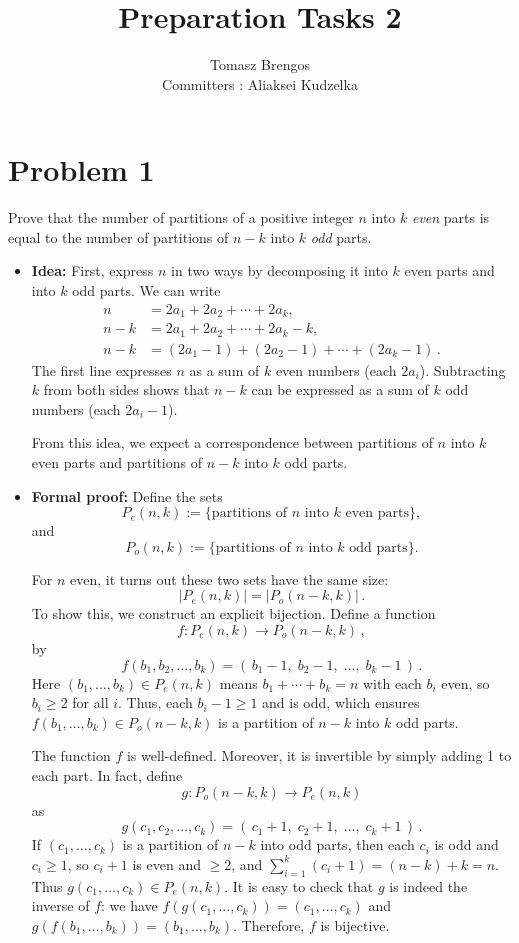 \documentclass[docmute]{article}
\title{Preparation Tasks 2}
\author{Tomasz Brengos \\  
Committers : Aliaksei Kudzelka}
\date{}
\begin{document}
\maketitle

\section{Problem 1} Prove that the number of partitions of a positive integer $n$ into $k$ \textit{even} parts
is equal to the number of partitions of $n-k$ into $k$ \textit{odd} parts.

\begin{itemize}
  \item \textbf{Idea:} First, express $n$ in two ways by decomposing it into $k$ even parts and into $k$ odd parts. We can write 
  \begin{align*}
    n &= 2a_1 + 2a_2 + \cdots + 2a_k,\\
    n - k &= 2a_1 + 2a_2 + \cdots + 2a_k - k,\\
    n - k &= (2a_1 - 1) + (2a_2 - 1) + \cdots + (2a_k - 1)\,.
  \end{align*}
  The first line expresses $n$ as a sum of $k$ even numbers (each $2a_i$). Subtracting $k$ from both sides shows that $n-k$ can be expressed as a sum of $k$ odd numbers (each $2a_i - 1$). 
  
  From this idea, we expect a correspondence between partitions of $n$ into $k$ even parts and partitions of $n-k$ into $k$ odd parts.
  
  \item \textbf{Formal proof:} Define the sets 
  \[
    P_e(n,k) := \{\text{partitions of $n$ into $k$ even parts}\}, 
  \] 
  and 
  \[
    P_o(n,k) := \{\text{partitions of $n$ into $k$ odd parts}\}. 
  \] 

  
  For $n$ even, it turns out these two sets have the same size: 
  \[
    |P_e(n,k)| = |P_o(n-k,k)|\,.
  \] 
  To show this, we construct an explicit bijection. Define a function 
  \[
    f: P_e(n,k) \to P_o(n-k,k)\,,
  \] 
  by 
  \[
    f(b_1,b_2,\ldots,b_k) = (\,b_1 - 1,\; b_2 - 1,\; \ldots,\; b_k - 1\,)\,. 
  \] 
  Here $(b_1,\ldots,b_k) \in P_e(n,k)$ means $b_1 + \cdots + b_k = n$ with each $b_i$ even, so $b_i \ge 2$ for all $i$. Thus, each $b_i - 1 \ge 1$ and is odd, which ensures $f(b_1,\ldots,b_k) \in P_o(n-k,k)$ is a partition of $n-k$ into $k$ odd parts.

  The function $f$ is well-defined. Moreover, it is invertible by simply adding 1 to each part. In fact, define 
  \[
    g: P_o(n-k,k) \to P_e(n,k)
  \] 
  as 
  \[
    g(c_1,c_2,\ldots,c_k) = (\,c_1 + 1,\; c_2 + 1,\; \ldots,\; c_k + 1\,)\,. 
  \] 
  If $(c_1,\ldots,c_k)$ is a partition of $n-k$ into odd parts, then each $c_i$ is odd and $c_i \ge 1$, so $c_i + 1$ is even and $\ge 2$, and $\sum_{i=1}^k (c_i + 1) = (n-k) + k = n$. Thus $g(c_1,\ldots,c_k) \in P_e(n,k)$. It is easy to check that $g$ is indeed the inverse of $f$: we have $f(g(c_1,\ldots,c_k)) = (c_1,\ldots,c_k)$ and $g(f(b_1,\ldots,b_k)) = (b_1,\ldots,b_k)$. Therefore, $f$ is bijective.
\end{itemize}
\end{document}
